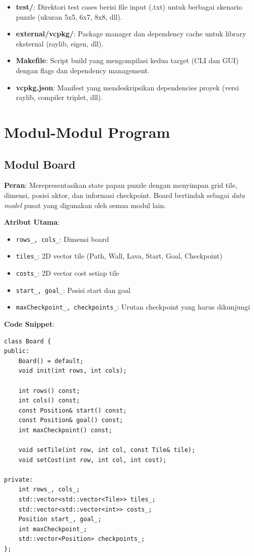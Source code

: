 \begin{itemize}
    \item \textbf{test/}: Direktori test cases berisi file input (.txt) untuk berbagai skenario puzzle (ukuran 5x5, 6x7, 8x8, dll).

    \item \textbf{external/vcpkg/}: Package manager dan dependency cache untuk library eksternal (raylib, eigen, dll).

    \item \textbf{Makefile}: Script build yang mengompilasi kedua target (CLI dan GUI) dengan flags dan dependency management.

    \item \textbf{vcpkg.json}: Manifest yang mendeskripsikan dependencies proyek (versi raylib, compiler triplet, dll).
\end{itemize}

\section{Modul-Modul Program}

\subsection{Modul Board}

\textbf{Peran}: Merepresentasikan state papan puzzle dengan menyimpan grid tile, dimensi, posisi aktor, dan informasi checkpoint. Board bertindak sebagai \emph{data model} pusat yang digunakan oleh semua modul lain.

\textbf{Atribut Utama}:
\begin{itemize}
    \item \texttt{rows\_, cols\_}: Dimensi board
    \item \texttt{tiles\_}: 2D vector tile (Path, Wall, Lava, Start, Goal, Checkpoint)
    \item \texttt{costs\_}: 2D vector cost setiap tile
    \item \texttt{start\_, goal\_}: Posisi start dan goal
    \item \texttt{maxCheckpoint\_, checkpoints\_}: Urutan checkpoint yang harus dikunjungi
\end{itemize}

\textbf{Code Snippet}:
\begin{tcolorbox}[colback=blue!5, title=Board Class Header]
    \begin{verbatim}
class Board {
public:
    Board() = default;
    void init(int rows, int cols);
    
    int rows() const;
    int cols() const;
    const Position& start() const;
    const Position& goal() const;
    int maxCheckpoint() const;
    
    void setTile(int row, int col, const Tile& tile);
    void setCost(int row, int col, int cost);

private:
    int rows_, cols_;
    std::vector<std::vector<Tile>> tiles_;
    std::vector<std::vector<int>> costs_;
    Position start_, goal_;
    int maxCheckpoint_;
    std::vector<Position> checkpoints_;
};
\end{verbatim}
\end{tcolorbox}

